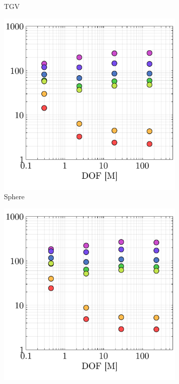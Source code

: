 \documentclass[10pt,a4paper]{article}
\begin{document}
\begin{figure}[!t]
\begin{subfigure}[t]{0.32\linewidth}
    \caption{TGV\hspace*{-1em}}
  \end{subfigure}
  \begin{subfigure}[t]{0.32\linewidth}
    \centering\hspace*{-0.2cm}
    \includegraphics[width=\linewidth]{img/sphere_cost.pdf}
    \caption{Sphere\hspace*{-1em}}
  \end{subfigure}
  \begin{subfigure}[t]{0.32\linewidth}
    \centering\hspace*{-0.2cm}
    \includegraphics[width=\linewidth]{img/cylinder_cost.pdf}

\end{subfigure}
\end{figure}
\end{document}
